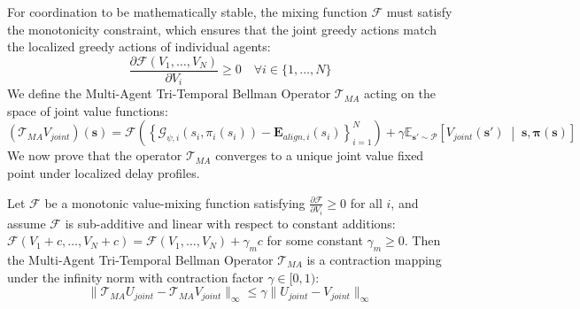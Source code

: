 \documentclass[manuscript, screen, review]{jair}
\begin{document}
For coordination to be mathematically stable, the mixing function $\mathcal{F}$ must satisfy the monotonicity constraint, which ensures that the joint greedy actions match the localized greedy actions of individual agents:
\begin{equation}
    \frac{\partial \mathcal{F}(V_1, \dots, V_N)}{\partial V_i} \ge 0 \quad \forall i \in \{1, \dots, N\}
\end{equation}
We define the Multi-Agent Tri-Temporal Bellman Operator $\mathcal{T}_{MA}$ acting on the space of joint value functions:
\begin{equation}
    \left( \mathcal{T}_{MA} V_{joint} \right)(\mathbf{s}) = \mathcal{F}\left( \left\{ \mathcal{G}_{\psi, i}(s_i, \pi_i(s_i)) - \mathbf{E}_{align, i}(s_i) \right\}_{i=1}^N \right) + \gamma \mathbb{E}_{\mathbf{s}' \sim \mathcal{P}} \left[ V_{joint}(\mathbf{s}') \;\middle|\; \mathbf{s}, \boldsymbol{\pi}(\mathbf{s}) \right]
\end{equation}
We now prove that the operator $\mathcal{T}_{MA}$ converges to a unique joint value fixed point under localized delay profiles.

\begin{theorem}
Let $\mathcal{F}$ be a monotonic value-mixing function satisfying $\frac{\partial \mathcal{F}}{\partial V_i} \ge 0$ for all $i$, and assume $\mathcal{F}$ is sub-additive and linear with respect to constant additions: $\mathcal{F}(V_1 + c, \dots, V_N + c) = \mathcal{F}(V_1, \dots, V_N) + \gamma_m c$ for some constant $\gamma_m \ge 0$. Then the Multi-Agent Tri-Temporal Bellman Operator $\mathcal{T}_{MA}$ is a contraction mapping under the infinity norm with contraction factor $\gamma \in [0, 1)$:
\begin{equation}
    \| \mathcal{T}_{MA} U_{joint} - \mathcal{T}_{MA} V_{joint} \|_\infty \le \gamma \| U_{joint} - V_{joint} \|_\infty
\end{equation}
\end{theorem}
\end{document}
